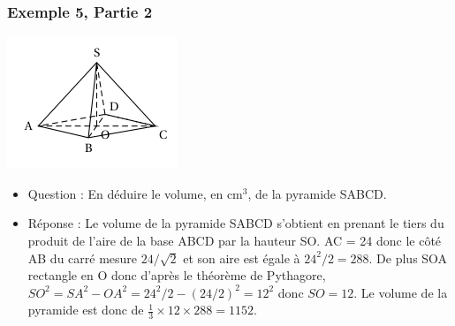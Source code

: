 \documentclass[xcolor=svgnames,t,final]{beamer}
\begin{document}
\begin{frame}



\frametitle{Exemple 5, Partie 2}


\begin{center}
\includegraphics[scale=0.5]{images/exemple5.png}
\end{center}

\begin{itemize}
\pause \item {\color{blue} Question : En déduire le volume, en cm$^3$, de la pyramide SABCD.}
\pause \item {\color{red} Réponse : Le volume de la pyramide SABCD s'obtient en prenant le tiers du produit de l'aire de la base ABCD par la hauteur SO.  AC = 24 donc le côté AB du carré mesure $24/\sqrt{2}$ et son aire est égale à $24^{2}/2= 288$. De plus SOA rectangle en O donc d'après le théorème de  Pythagore, $SO^{2}=SA^{2}-OA^{2}=24^{2}/2 - (24/2)^{2}=12^{2}$ donc $SO=12$. Le volume de la pyramide est donc  de $\frac{1}{3} \times 12 \times 288=1152$.
}
\end{itemize}



\end{frame}
\end{document}
